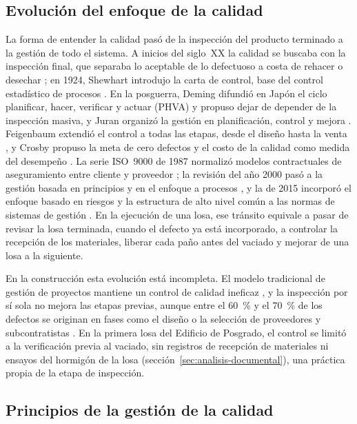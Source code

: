 \subsection{Evolución del enfoque de la calidad}

La forma de entender la calidad pasó de la inspección del producto terminado a la gestión de todo el sistema. A inicios del siglo~XX la calidad se buscaba con la inspección final, que separaba lo aceptable de lo defectuoso a costa de rehacer o desechar \parencite[p.~9]{alfaro2011}; en 1924, Shewhart introdujo la carta de control, base del control estadístico de procesos \parencite[pp.~11--12]{aguilar2016}. En la posguerra, Deming difundió en Japón el ciclo planificar, hacer, verificar y actuar (PHVA) y propuso dejar de depender de la inspección masiva, y Juran organizó la gestión en planificación, control y mejora \parencite[pp.~14--19]{aguilar2016}. Feigenbaum extendió el control a todas las etapas, desde el diseño hasta la venta \parencite[p.~14]{alfaro2011}, y Crosby propuso la meta de cero defectos y el costo de la calidad como medida del desempeño \parencite[pp.~29--30]{cepeda2017}. La serie ISO~9000 de 1987 normalizó modelos contractuales de aseguramiento entre cliente y proveedor \parencite[pp.~15--16]{alfaro2011}; la revisión del año 2000 pasó a la gestión basada en principios y en el enfoque a procesos \parencite[pp.~19--20]{alfaro2011}, y la de 2015 incorporó el enfoque basado en riesgos y la estructura de alto nivel común a las normas de sistemas de gestión \parencite[p.~20]{mamanicalsina2025}. En la ejecución de una losa, ese tránsito equivale a pasar de revisar la losa terminada, cuando el defecto ya está incorporado, a controlar la recepción de los materiales, liberar cada paño antes del vaciado y mejorar de una losa a la siguiente.

En la construcción esta evolución está incompleta. El modelo tradicional de gestión de proyectos mantiene un control de calidad ineficaz \parencite[p.~11]{pons2014}, y la inspección por sí sola no mejora las etapas previas, aunque entre el 60~\% y el 70~\% de los defectos se originan en fases como el diseño o la selección de proveedores y subcontratistas \parencite[p.~11]{alfaro2011}. En la primera losa del Edificio de Posgrado, el control se limitó a la verificación previa al vaciado, sin registros de recepción de materiales ni ensayos del hormigón de la losa (sección~\ref{sec:analisis-documental}), una práctica propia de la etapa de inspección.

\subsection{Principios de la gestión de la calidad}

